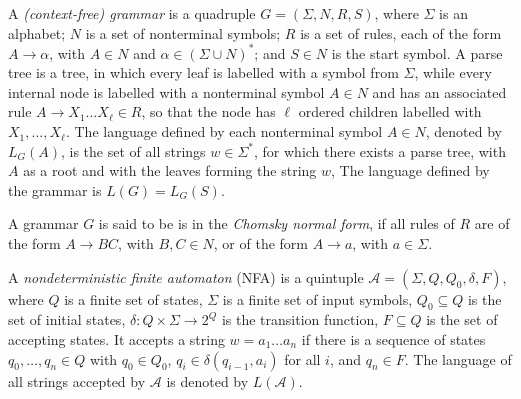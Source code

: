 \documentclass[runningheads]{llncs}
\begin{document}
A \textit{(context-free) grammar} is a quadruple $G = (\Sigma, N, R, S)$,
where $\Sigma$ is an alphabet;
$N$ is a set of nonterminal symbols;
$R$ is a set of rules, each of the form $A \to \alpha$,
with $A \in N$ and $\alpha \in (\Sigma \cup N)^*$;
and $S \in N$ is the start symbol.
A parse tree is a tree, in which 
every leaf is labelled with a symbol from $\Sigma$,
while every internal node is labelled with a nonterminal symbol $A \in N$
and has an associated rule $A \to X_1 \ldots X_\ell \in R$,
so that the node has $\ell$ ordered children labelled with $X_1, \ldots, X_\ell$.
The language defined by each nonterminal symbol $A \in N$, denoted by $L_G(A)$,
is the set of all strings $w \in \Sigma^*$,
for which there exists a parse tree,
with $A$ as a root
and with the leaves forming the string $w$,
The language defined by the grammar is $L(G)=L_G(S)$.

A grammar $G$ is said to be is in the \textit{Chomsky normal form},
if all rules of $R$ are of the form
$A \to BC$, with $B, C \in N$, or of the form $A \to a$, with $a \in \Sigma$. 

A \textit{nondeterministic finite automaton} (NFA) is a quintuple
$\mathcal{A}=(\Sigma, Q, Q_0, \delta, F)$, where $Q$ is a finite set of states,
$\Sigma$ is a finite set of input symbols,
$Q_0 \subseteq Q$ is the set of initial states,
$\delta \colon Q \times \Sigma \to 2^Q$ is the transition function,
$F \subseteq Q$ is the set of accepting states.
It accepts a string $w=a_1 \ldots a_n$ if there is a sequence of states $q_0, \ldots, q_n \in Q$
with $q_0 \in Q_0$, $q_i \in \delta(q_{i-1}, a_i)$ for all $i$, and $q_n \in F$.
The language of all strings accepted by $\mathcal{A}$ is denoted by $L(\mathcal{A})$.
\end{document}
